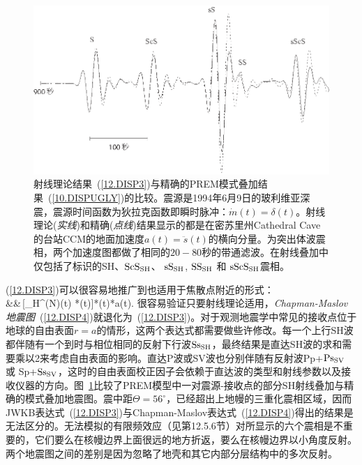 \begin{figure}[!t]
\begin{center}
\includegraphics{../figures/chap12/fig28.eps}
\end{center}
\caption[RaysvsModes]{\label{12.fig.jeroen}
射线理论结果~(\ref{12.DISP3})与精确的PREM模式叠加结果~(\ref{10.DISPUGLY})的比较。震源是1994年6月9日的玻利维亚深震，震源时间函数为狄拉克函数即瞬时脉冲：$\dot{m}(t)=\delta(t)$。射线理论({\em 实线\/})和精确({\em 点线\/})结果显示的都是在密苏里州Cathedral Cave的台站CCM的地面加速度$a(t)=\ddot{s}(t)$的横向分量。为突出体波震相，两个加速度图都做了相同的$20\!-\!80$秒的带通滤波。在射线叠加中仅包括了标识的SH、${\rm ScS}_{\rm SH}$、
${\rm sS}_{\rm SH}$, ${\rm SS}_{\rm SH}$ 和
${\rm sScS}_{\rm SH}$震相。
}
\end{figure}
(\ref{12.DISP3})可以很容易地推广到也适用于焦散点附近的形式：
\eqa \label{12.DISP4}  \nonumber \\
&&\mbox{}\qquad\times{}\,[\Lambda_{\rm H}^{(N)}(t)
*\sigma(t)]*(t)*a(t).
\ena
很容易验证只要射线理论适用，{\em Chapman-Maslov 地震图\/}~(\ref{12.DISP4})就退化为~(\ref{12.DISP3})。对于观测地震学中常见的接收点位于地球的自由表面$r=a$的情形，这两个表达式都需要做些许修改。每一个上行SH波都伴随有一个到时与相位相同的反射下行波${\rm Ss}_{\rm SH}$，最终结果是直达SH波的求和需要乘以2来考虑自由表面的影响。直达P波或SV波也分别伴随有反射波Pp\hspace{0.3 mm}+\hspace{0.3 mm}${\rm Ps}_{\rm SV}$
或 Sp\hspace{0.3 mm}+\hspace{0.4 mm}${\rm Ss}_{\rm SV}$，这时的自由表面校正因子会依赖于直达波的类型和射线参数以及接收仪器的方向。图~\ref{12.fig.jeroen}比较了PREM模型中一对震源-接收点的部分SH射线叠加与精确的模式叠加地震图。震中距$\Theta=56^{\circ}$，已经超出上地幔的三重化震相区域，因而JWKB表达式~(\ref{12.DISP3})与Chapman-Maslov表达式~(\ref{12.DISP4})得出的结果是无法区分的。无法模拟的有限频效应（见第12.5.6节）对所显示的六个震相是不重要的，它们要么在核幔边界上面很远的地方折返，要么在核幔边界以小角度反射。两个地震图之间的差别是因为忽略了地壳和其它内部分层结构中的多次反射。

